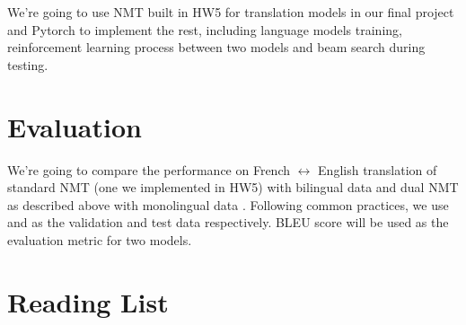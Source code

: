 \documentclass[11pt]{article}
\begin{document}
We're going to use NMT built in HW5 for translation models in our final project and Pytorch to implement the rest, including language models training,  reinforcement learning process between two models and beam search during testing.
\part{Evaluation}
We're going to compare the performance on French $\leftrightarrow$ English translation of standard NMT (one we implemented in HW5) with bilingual data \href{http://www.statmt.org/europarl/}{\color{blue}{Europarl v7}} and dual NMT as described above with monolingual data \href{http://www.statmt.org/wmt17/translation-task.html}{\color{blue}{News Crawl: articles from 2010}}.  Following common practices, we use \href{http://data.statmt.org/wmt16/translation-task/dev.tgz}{\color{blue}{news-test2012}} and \href{http://data.statmt.org/wmt16/translation-task/dev.tgz}{\color{blue}{news-test2013}} as the validation and test data respectively.  BLEU score will be used as the evaluation metric for two models.
\part{Reading List}
\begingroup
\renewcommand{\section}[2]{}


\nocite{*}
\endgroup
\end{document}
